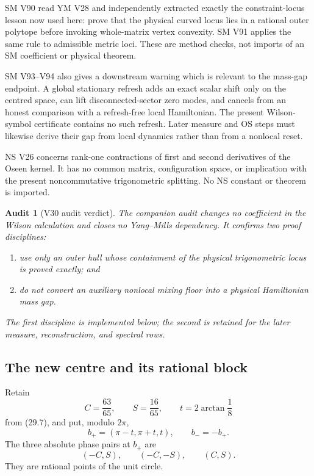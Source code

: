 \documentclass[11pt,oneside]{article}
\newtheorem{audit}[theorem]{Audit}
\theoremstyle{definition}
\theoremstyle{remark}
\begin{document}
SM V90 read YM V28 and independently extracted exactly the
constraint-locus lesson now used here: prove that the physical
curved locus lies in a rational outer polytope before invoking
whole-matrix vertex convexity.  SM V91 applies the same rule to
admissible metric loci.  These are method checks, not imports of an
SM coefficient or physical theorem.

SM V93--V94 also gives a downstream warning which is relevant to the
mass-gap endpoint.  A global stationary refresh adds an exact scalar
shift only on the centred space, can lift disconnected-sector zero
modes, and cancels from an honest comparison with a refresh-free
local Hamiltonian.  The present Wilson-symbol certificate contains
no such refresh.  Later measure and OS steps must likewise derive
their gap from local dynamics rather than from a nonlocal reset.

NS V26 concerns rank-one contractions of first and second
derivatives of the Oseen kernel.  It has no common matrix,
configuration space, or implication with the present
noncommutative trigonometric splitting.  No NS constant or theorem
is imported.

\begin{audit}[V30 audit verdict]
\label{aud:newv30-verdict}
The companion audit changes no coefficient in the Wilson
calculation and closes no Yang--Mills dependency.  It confirms two
proof disciplines:
\begin{enumerate}[label=\textup{(\roman*)}]
\item use only an outer hull whose containment of the physical
      trigonometric locus is proved exactly; and
\item do not convert an auxiliary nonlocal mixing floor into a
      physical Hamiltonian mass gap.
\end{enumerate}
The first discipline is implemented below; the second is retained
for the later measure, reconstruction, and spectral rows.
\end{audit}

\subsection{The new centre and its rational block}

Retain
\[
 C=\frac{63}{65},\qquad S=\frac{16}{65},\qquad
 t=2\arctan\frac18
\]
from (29.7), and put, modulo \(2\pi\),
\[
 b_+=(\pi-t,\pi+t,t),\qquad b_-=-b_+.                  \tag{30.3}
\]
The three absolute phase pairs at \(b_+\) are
\[
 (-C,S),\qquad(-C,-S),\qquad(C,S).                     \tag{30.4}
\]
They are rational points of the unit circle.
\end{document}
